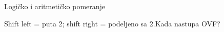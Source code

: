 
\begin{frame}[label=05-s032]{Logičko i aritmetičko pomeranje}
\fontsize{10}{12}\selectfont\setlength{\parskip}{0pt}\setlength{\tabcolsep}{2pt}


\par\smallskip
Shift left = puta 2; shift right = podeljeno sa 2.\hfill Kada nastupa OVF?
\end{frame}
